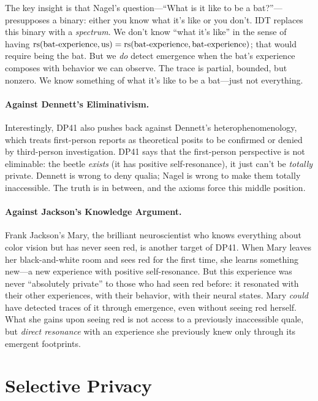 The key insight is that Nagel's question---``What is it like to be a
bat?''---presupposes a binary: either you know what it's like or you don't.
IDT replaces this binary with a \emph{spectrum}.  We don't know ``what it's
like'' in the sense of having $\mathrm{rs}(\mathrm{bat\text{-}experience}, \mathrm{us})
= \mathrm{rs}(\mathrm{bat\text{-}experience}, \mathrm{bat\text{-}experience})$; that
would require being the bat.  But we \emph{do} detect emergence when the bat's
experience composes with behavior we can observe.  The trace is partial, bounded,
but nonzero.  We know something of what it's like to be a bat---just not
everything.

\paragraph{Against Dennett's Eliminativism.}
Interestingly, DP41 also pushes back against Dennett's heterophenomenology,
which treats first-person reports as theoretical posits to be confirmed or
denied by third-person investigation.  DP41 says that the first-person
perspective is not eliminable: the beetle \emph{exists} (it has positive
self-resonance), it just can't be \emph{totally} private.  Dennett is wrong
to deny qualia; Nagel is wrong to make them totally inaccessible.  The truth
is in between, and the axioms force this middle position.

\paragraph{Against Jackson's Knowledge Argument.}
Frank Jackson's Mary, the brilliant neuroscientist who knows everything about
color vision but has never seen red, is another target of DP41.  When Mary
leaves her black-and-white room and sees red for the first time, she learns
something new---a new experience with positive self-resonance.  But this
experience was never ``absolutely private'' to those who had seen red before:
it resonated with their other experiences, with their behavior, with their
neural states.  Mary \emph{could} have detected traces of it through emergence,
even without seeing red herself.  What she gains upon seeing red is not access
to a previously inaccessible quale, but \emph{direct resonance} with an
experience she previously knew only through its emergent footprints.

\section{Selective Privacy}

